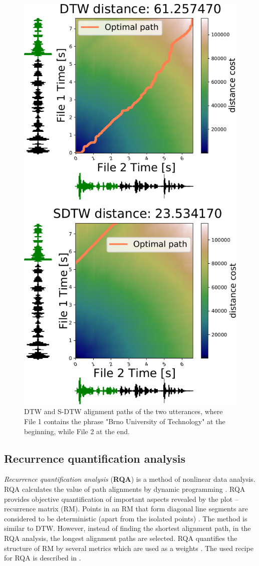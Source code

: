 \documentclass{ExcelAtFIT}
\begin{document}
\begin{figure}[hbt]
	\centering
	\includegraphics[width=0.8\linewidth]{images/DTW_SDTW_comparision2edited.pdf}
	\caption{DTW and S-DTW alignment paths of the two utterances, where File 1 contains the phrase "Brno University of Technology" at the beginning, while File 2 at the end.}
    \label{fig:SDTWresult}
\end{figure}


\subsection{Recurrence quantification analysis}
\textit{Recurrence quantification analysis} (\textbf{RQA}) is a method of nonlinear data analysis. RQA calculates the value of path alignments by dynamic programming \cite{LibrosaRQAref}. RQA provides objective quantification of important aspects revealed by the plot -- recurrence matrix (RM). Points in an RM that form diagonal line segments are considered to be deterministic (apart from the isolated points) \cite{RQAbook}.
The method is similar to DTW. However, instead of finding the shortest alignment path, in the RQA analysis, the longest alignment paths are selected. 
RQA quantifies the structure of RM by several metrics which are used as a weights \cite{RQAindices}. 
The used recipe for RQA is described in \cite{LibrosaRQAref}.
\end{document}
